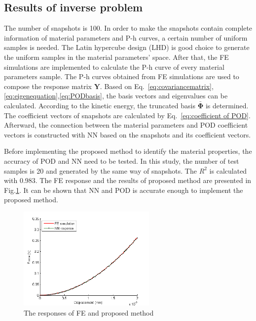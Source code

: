 \documentclass[review]{elsarticle}
\begin{document}
\subsection{Results of inverse problem}

The number of snapshots is 100. In order to make the snapshots contain complete information of material parameters and P-h curves, a certain number of uniform samples is needed. The Latin hypercube design (LHD) \cite{iman2008latin} is good choice to generate the uniform samples in the material parameters' space. After that, the FE simulations are implemented to calculate the P-h curve of every material parameters sample. The P-h curves obtained from FE simulations are used to compose the response matrix $\mathbf{Y}$. Based on Eq.~\ref{eq:covariancematrix},\ref{eq:eigenequation},\ref{eq:PODbasis}, the basis vectors and eigenvalues can be calculated. According to the kinetic energy, the truncated basis $\bar{\mathbf{\Phi}}$ is determined. The coefficient vectors of snapshots are calculated by Eq.~\ref{eq:coefficient of POD}. Afterward, the connection between the material parameters and POD coefficient vectors is constructed with NN based on the snapshots and its coefficient vectors.

Before implementing the proposed method to identify the material properties, the accuracy of POD and NN need to be tested. In this study, the number of test samples is 20 and generated by the same way of snapshots. The $R^2$ is calculated with 0.983. The FE response and the results of proposed method are presented in Fig.\ref{fig:accuracy_of_NN}. It can be shown that NN and POD is accurate enough to implement the proposed method.

\begin{figure}[h!]
\centering
\includegraphics[width=0.6\textwidth]{./figs/accuracy_of_NN.png}
\caption{The responses of FE and proposed method}
\label{fig:accuracy_of_NN}
\end{figure}
\end{document}
